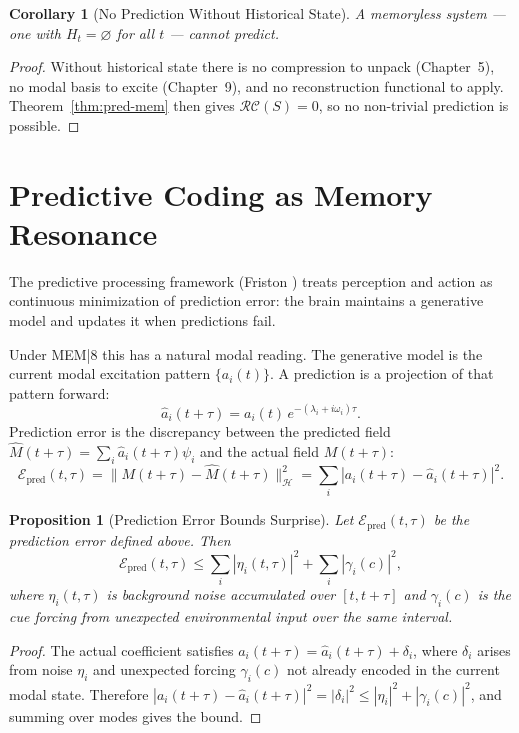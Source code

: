 \documentclass[12pt, oneside]{book}
\theoremstyle{plain}
\newtheorem{proposition}[theorem]{Proposition}
\newtheorem{corollary}[theorem]{Corollary}
\theoremstyle{definition}
\theoremstyle{remark}
\newcommand{\calH}{\mathcal{H}}
\begin{document}
\begin{corollary}[No Prediction Without Historical State]
A memoryless system --- one with $H_t = \varnothing$ for
all $t$ --- cannot predict.
\end{corollary}

\begin{proof}
Without historical state there is no compression to unpack
(Chapter~5), no modal basis to excite (Chapter~9), and
no reconstruction functional to apply.
Theorem~\ref{thm:pred-mem} then gives $\mathcal{RC}(S) = 0$,
so no non-trivial prediction is possible.
\end{proof}

\section{Predictive Coding as Memory Resonance}

The predictive processing framework (Friston \cite{Friston2010})
treats perception and action as continuous minimization of
prediction error: the brain maintains a generative model
and updates it when predictions fail.

Under MEM|8 this has a natural modal reading.
The generative model is the current modal excitation pattern
$\{a_i(t)\}$.
A prediction is a projection of that pattern forward:
\[
  \hat{a}_i(t+\tau) = a_i(t)\,e^{-(\lambda_i + i\omega_i)\tau}.
\]
Prediction error is the discrepancy between the predicted
field $\hat{M}(t+\tau) = \sum_i \hat{a}_i(t+\tau)\psi_i$
and the actual field $M(t+\tau)$:
\[
  \mathcal{E}_{\mathrm{pred}}(t,\tau)
  = \|M(t+\tau) - \hat{M}(t+\tau)\|_{\calH}^2
  = \sum_i |a_i(t+\tau) - \hat{a}_i(t+\tau)|^2.
\]

\begin{proposition}[Prediction Error Bounds Surprise]
Let $\mathcal{E}_{\mathrm{pred}}(t,\tau)$ be the prediction
error defined above.
Then
\[
  \mathcal{E}_{\mathrm{pred}}(t,\tau)
  \leq \sum_i |\eta_i(t,\tau)|^2
       + \sum_i |\gamma_i(c)|^2,
\]
where $\eta_i(t,\tau)$ is background noise accumulated
over $[t, t+\tau]$ and $\gamma_i(c)$ is the cue forcing
from unexpected environmental input over the same interval.
\end{proposition}

\begin{proof}
The actual coefficient satisfies
$a_i(t+\tau) = \hat{a}_i(t+\tau) + \delta_i$,
where $\delta_i$ arises from noise $\eta_i$ and
unexpected forcing $\gamma_i(c)$ not already encoded
in the current modal state.
Therefore
$|a_i(t+\tau) - \hat{a}_i(t+\tau)|^2 = |\delta_i|^2
\leq |\eta_i|^2 + |\gamma_i(c)|^2$,
and summing over modes gives the bound.
\end{proof}
\end{document}
